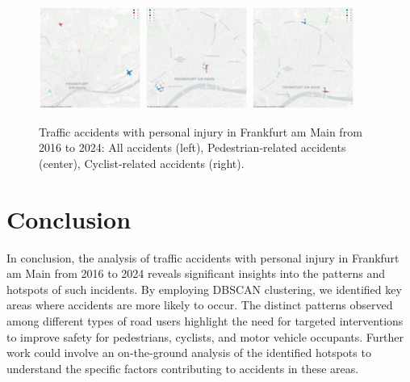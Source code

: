 \documentclass[10pt,a4paper]{article} %
\begin{document}
\begin{figure}[h!]
    \centering
    \includegraphics[width=0.3\textwidth]{../src/img/clusters_all_accidents.png}
    \includegraphics[width=0.3\textwidth]{../src/img/clusters_pedestrians.png}
    \includegraphics[width=0.3\textwidth]{../src/img/clusters_cyclists.png}
    \caption{Traffic accidents with personal injury in Frankfurt am Main from 2016 to 2024: All accidents (left), Pedestrian-related accidents (center), Cyclist-related accidents (right).}
\end{figure}

\section*{Conclusion}
In conclusion, the analysis of traffic accidents with personal injury in Frankfurt am Main from 2016 to 2024 reveals significant insights into the patterns and hotspots of such incidents. By employing DBSCAN clustering, we identified key areas where accidents are more likely to occur. The distinct patterns observed among different types of road users highlight the need for targeted interventions to improve safety for pedestrians, cyclists, and motor vehicle occupants. Further work could involve an on-the-ground analysis of the identified hotspots to understand the specific factors contributing to accidents in these areas.
\end{document}
